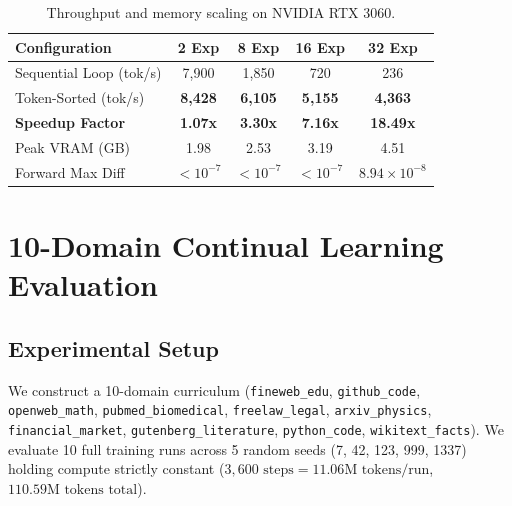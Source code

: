 \documentclass[10pt,twocolumn,letterpaper]{article}
\begin{document}
\begin{table}[h]
\centering
\small
\begin{tabular}{@{}lcccc@{}}
\toprule
\textbf{Configuration} & \textbf{2 Exp} & \textbf{8 Exp} & \textbf{16 Exp} & \textbf{32 Exp} \\ \midrule
Sequential Loop (tok/s) & 7,900 & 1,850 & 720 & 236 \\
Token-Sorted (tok/s) & \textbf{8,428} & \textbf{6,105} & \textbf{5,155} & \textbf{4,363} \\
\textbf{Speedup Factor} & \textbf{1.07x} & \textbf{3.30x} & \textbf{7.16x} & \textbf{18.49x} \\
Peak VRAM (GB) & 1.98 & 2.53 & 3.19 & 4.51 \\
Forward Max Diff & $<10^{-7}$ & $<10^{-7}$ & $<10^{-7}$ & $8.94\times 10^{-8}$ \\
\bottomrule
\end{tabular}
\caption{Throughput and memory scaling on NVIDIA RTX 3060.}
\label{tab:hardware}
\end{table}

\section{10-Domain Continual Learning Evaluation}

\subsection{Experimental Setup}
We construct a 10-domain curriculum (\texttt{fineweb\_edu}, \texttt{github\_code}, \texttt{openweb\_math}, \texttt{pubmed\_biomedical}, \texttt{freelaw\_legal}, \texttt{arxiv\_physics}, \texttt{financial\_market}, \texttt{gutenberg\_literature}, \texttt{python\_code}, \texttt{wikitext\_facts}). We evaluate 10 full training runs across 5 random seeds (7, 42, 123, 999, 1337) holding compute strictly constant ($3,600\text{ steps} = 11.06\text{M tokens/run}$, $110.59\text{M tokens total}$).
\end{document}
